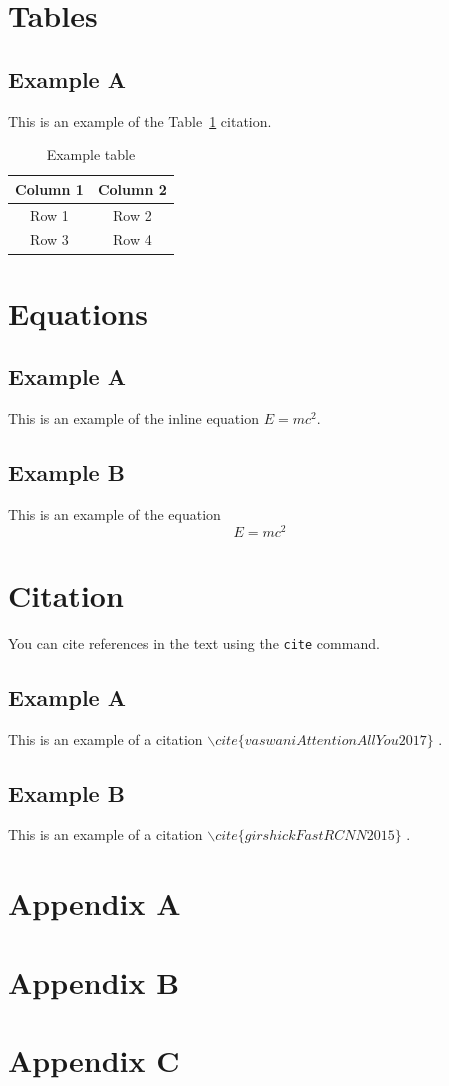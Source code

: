 \documentclass{scnuthesis}
\begin{document}
    \section{Tables}
    \subsection{Example A}
    This is an example of the Table~\ref{tab:example-table} citation.
    \begin{table}[htbp]
        \centering
        \caption{Example table}
        \label{tab:example-table}
        \begin{tabular}{|c|c|}
            \hline
            Column 1 & Column 2 \\
            \hline
            Row 1    & Row 2    \\
            \hline
            Row 3    & Row 4    \\
            \hline
        \end{tabular}
    \end{table}

    \section{Equations}
    \subsection{Example A}
    This is an example of the inline equation $E=mc^{2}$.
    \subsection{Example B}
    This is an example of the equation
    \begin{equation}
        E=mc^{2}
    \end{equation}

    \section{Citation}
    You can cite references in the text using the \texttt{cite} command.
    \subsection{Example A}
    This is an example of a citation
    $\backslash cite\{vaswaniAttentionAllYou2017\}$
    \cite{vaswaniAttentionAllYou2017}.
    \subsection{Example B}
    This is an example of a citation $\backslash cite\{girshickFastRCNN2015\}$ \cite{girshickFastRCNN2015}.

    \appendix
    \section{Appendix A}
    \section{Appendix B}
    \section{Appendix C}

    \acknowledgements
\end{document}
